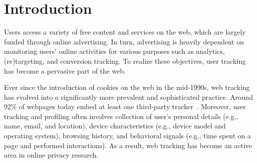 \section{Introduction}
\label{sec:introduction}

Users access a variety of free content and services on the web, which are largely funded through online advertising.
%
In turn, advertising is heavily dependent on monitoring users' online activities for various purposes
%
such as analytics, (re)targeting, and conversion tracking.
%
To realize these objectives, user tracking has become a pervasive part of the web.
%

Ever since the introduction of cookies on the web in the mid-1990s, web tracking has evolved into a significantly more prevalent and sophisticated practice.
%
Around 92\% of webpages today embed at least one third-party tracker~\cite{urban2024WebAlmanac2024}.
%
Moreover, user tracking and profiling often involves collection of user's personal details (e.g., name, email, and location), device characteristics (e.g., device model and operating system), browsing history, and behavioral signals (e.g., time spent on a page and performed interactions).
%
As a result, web tracking has become an active area in online privacy research.

